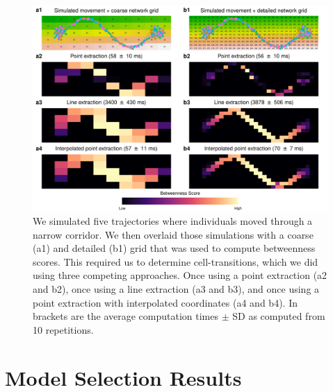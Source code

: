 \documentclass[../FinalThesis.tex]{subfiles}
\begin{document}
\begin{figure}[!ht]
 \begin{center}
  \includegraphics[width = \textwidth]{Figures/BetweennessApproaches.png}
  \caption{We simulated five trajectories where individuals moved through a
  narrow corridor. We then overlaid those simulations with a coarse (a1) and
  detailed (b1) grid that was used to compute betweenness scores. This required
  us to determine cell-transitions, which we did using three competing
  approaches. Once using a point extraction (a2 and b2), once using a line
  extraction (a3 and b3), and once using a point extraction with interpolated
  coordinates (a4 and b4). In brackets are the average computation times $\pm$
  SD as computed from 10 repetitions.}
  \label{BetweennessComparison}
 \end{center}
\end{figure}

\newpage
{}

\section{Model Selection Results}
\end{document}
